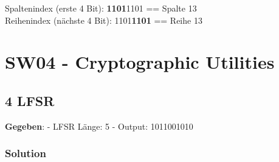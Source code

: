 \documentclass[11pt]{article}
\begin{document}
Spaltenindex (erste 4 Bit): \textbf{1101}1101 == Spalte 13\\
Reihenindex (nächste 4 Bit): 1101\textbf{1101} == Reihe 13

    
\newpage

    \hypertarget{sw04---cryptographic-utilities}{%
\section{SW04 - Cryptographic
Utilities}\label{sw04---cryptographic-utilities}}

    \hypertarget{lfsr}{%
\subsection{4 LFSR}\label{lfsr}}

\textbf{Gegeben}: - LFSR Länge: 5 - Output: 1011001010

\hypertarget{solution}{%
\subsubsection{Solution}\label{solution}}
\end{document}
